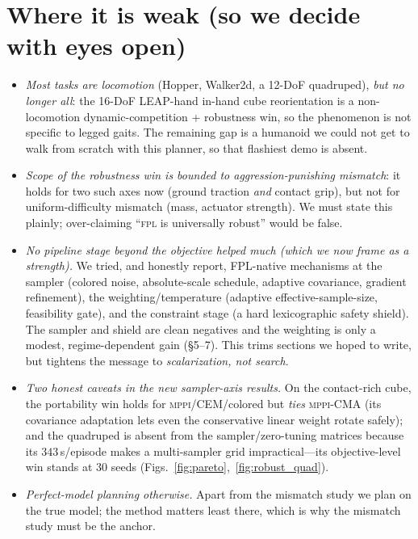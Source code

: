 \documentclass[11pt]{article}
\newcommand{\fpl}{\textsc{fpl}}
\newcommand{\mppi}{\textsc{mppi}}
\begin{document}
\section{Where it is weak (so we decide with eyes open)}

\begin{itemize}[leftmargin=1.4em,itemsep=2pt]
\item \emph{Most tasks are locomotion} (Hopper, Walker2d, a 12-DoF quadruped), \emph{but no longer
      all}: the 16-DoF LEAP-hand in-hand cube reorientation is a non-locomotion
      dynamic-competition + robustness win, so the phenomenon is not specific to legged gaits.
      The remaining gap is a humanoid we could not get to walk from scratch with this planner, so
      that flashiest demo is absent.
\item \emph{Scope of the robustness win is bounded to aggression-punishing mismatch}: it holds
      for two such axes now (ground traction \emph{and} contact grip), but not for
      uniform-difficulty mismatch (mass, actuator strength). We must state this plainly;
      over-claiming ``\fpl{} is universally robust'' would be false.
\item \emph{No pipeline stage beyond the objective helped much (which we now frame as a strength).}
      We tried, and honestly report, FPL-native mechanisms at the sampler (colored noise,
      absolute-scale schedule, adaptive covariance, gradient refinement), the weighting/temperature
      (adaptive effective-sample-size, feasibility gate), and the constraint stage (a hard
      lexicographic safety shield). The sampler and shield are clean negatives and the weighting is
      only a modest, regime-dependent gain (\S5--7). This trims sections we hoped to write, but
      tightens the message to \emph{scalarization, not search}.
\item \emph{Two honest caveats in the new sampler-axis results.} On the contact-rich cube, the
      portability win holds for \mppi/CEM/colored but \emph{ties} \mppi-CMA (its covariance
      adaptation lets even the conservative linear weight rotate safely); and the quadruped is
      absent from the sampler/zero-tuning matrices because its $343$\,s/episode makes a
      multi-sampler grid impractical---its objective-level win stands at 30 seeds
      (Figs.~\ref{fig:pareto},~\ref{fig:robust_quad}).
\item \emph{Perfect-model planning otherwise.} Apart from the mismatch study we plan on the true
      model; the method matters least there, which is why the mismatch study must be the anchor.
\end{itemize}
\end{document}
